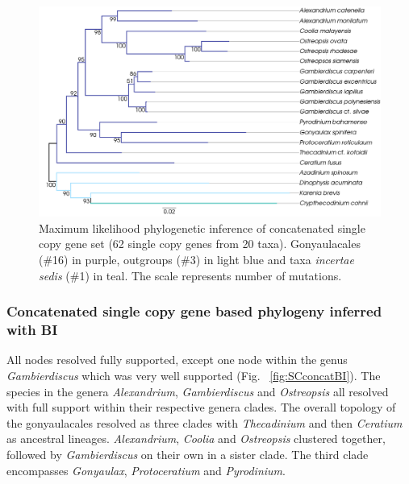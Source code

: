 \documentclass[12pt]{article}
\begin{document}
\begin{figure} 
\includegraphics[scale=.45]{figures/Singlecopy-concat-ML.png} 
\caption{Maximum likelihood phylogenetic inference of concatenated single copy gene set (62 single copy genes from 20 taxa). Gonyaulacales (\#16) in purple, outgroups (\#3) in light blue and taxa \textit{incertae sedis} (\#1) in teal. The scale represents number of mutations.} 
\label{fig:SCconcatML}
\end{figure} 
\FloatBarrier

\subsubsection*{Concatenated single copy gene based phylogeny inferred with BI}
\FloatBarrier 
All nodes resolved fully supported, except one node within the genus \textit{Gambierdiscus} which was very well supported (Fig. ~\ref{fig:SCconcatBI}). 
The species in the genera \textit{Alexandrium}, \textit{Gambierdiscus} and \textit{Ostreopsis} all resolved with full support within their respective genera clades. 
The overall topology of the gonyaulacales resolved as three clades with \textit{Thecadinium} and then \textit{Ceratium} as ancestral lineages. 
\textit{Alexandrium}, \textit{Coolia} and \textit{Ostreopsis} clustered together, followed by \textit{Gambierdiscus} on their own in a sister clade. 
The third clade encompasses \textit{Gonyaulax}, \textit{Protoceratium} and \textit{Pyrodinium}. 
\end{document}
